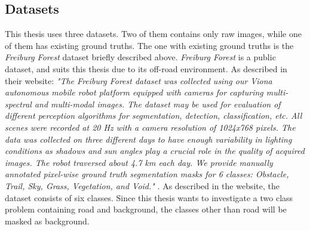 \documentclass[USenglish]{ifimaster}  %
\begin{document}
\subsection{Datasets}
This thesis uses three datasets. Two of them contains only raw images, while one of them has existing ground truths. The one with existing ground truths is the \textit{Freiburg Forest} dataset briefly described above. \textit{Freiburg Forest} is a public dataset, and suits this thesis due to its off-road environment. As described in their website:
\newline
\newline
\textit{"The Freiburg Forest dataset was collected using our Viona autonomous mobile robot platform equipped with cameras for capturing multi-spectral and multi-modal images. The dataset may be used for evaluation of different perception algorithms for segmentation, detection, classification, etc. All scenes were recorded at 20 Hz with a camera resolution of 1024x768 pixels. The data was collected on three different days to have enough variability in lighting conditions as shadows and sun angles play a crucial role in the quality of acquired images. The robot traversed about 4.7 km each day. We provide manually annotated pixel-wise ground truth segmentation masks for 6 classes: Obstacle, Trail, Sky, Grass, Vegetation, and Void."} \cite{website:deepscene_freiburg_forest_website}. 
\newline
\newline
As described in the website, the dataset consists of six classes. Since this thesis wants to investigate a two class problem containing road and background, the classes other than road will be masked as background.
\end{document}
